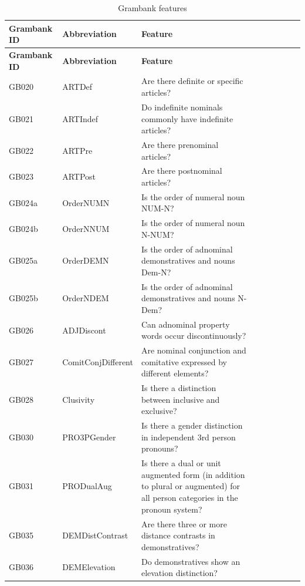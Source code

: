 \documentclass[draft,10pt]{article} %
\begin{document}
\singlespacing
\begin{landscape}
\begin{longtable}{| l | p{4cm}| p{12cm}|p{2cm}|p{2cm}|p{2cm}|p{2cm}|p{2cm}|p{2cm}|}

\caption{{Grambank features}} \label{Grambank_features_table} \\
\hline
\textbf{Grambank ID} & \textbf{Abbreviation} & \textbf{Feature}\\ \hline
\endfirsthead

\hline
\textbf{Grambank ID} & \textbf{Abbreviation} & \textbf{Feature}\\ \hline
\endhead
GB020 & ARTDef&Are there definite or specific articles?\\ \hline
GB021 & ARTIndef&Do indefinite nominals commonly have indefinite articles?\\ \hline
GB022 & ARTPre&Are there prenominal articles?\\ \hline
GB023 & ARTPost&Are there postnominal articles?\\ \hline
GB024a & OrderNUMN&Is the order of numeral noun NUM-N?\\ \hline
GB024b & OrderNNUM&Is the order of numeral noun N-NUM?\\ \hline
GB025a & OrderDEMN&Is the order of adnominal demonstratives and nouns Dem-N?\\ \hline
GB025b & OrderNDEM&Is the order of adnominal demonstratives and nouns N-Dem?\\ \hline
GB026 & ADJDiscont&Can adnominal property words occur discontinuously?\\ \hline
GB027 & ComitConjDifferent&Are nominal conjunction and comitative expressed by different elements?\\ \hline
GB028 & Clusivity&Is there a distinction between inclusive and exclusive?\\ \hline
GB030 & PRO3PGender&Is there a gender distinction in independent 3rd person pronouns?\\ \hline
GB031 & PRODualAug&Is there a dual or unit augmented form (in addition to plural or augmented) for all person categories in the pronoun system?\\ \hline
GB035 & DEMDistContrast&Are there three or more distance contrasts in demonstratives?\\ \hline
GB036 & DEMElevation&Do demonstratives show an elevation distinction?\\ \hline

\end{longtable}
\end{landscape}
\end{document}
